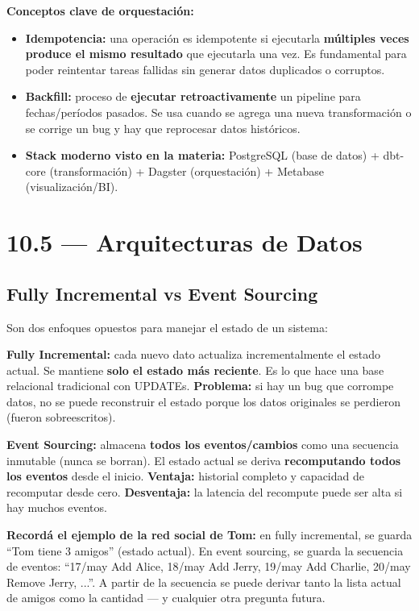 \documentclass[11pt, a4paper]{article}
\begin{document}
\textbf{Conceptos clave de orquestación:}
\begin{itemize}
	\item \textbf{Idempotencia:} una operación es idempotente si ejecutarla \textbf{múltiples veces produce el mismo resultado} que ejecutarla una vez. Es fundamental para poder reintentar tareas fallidas sin generar datos duplicados o corruptos.

	\item \textbf{Backfill:} proceso de \textbf{ejecutar retroactivamente} un pipeline para fechas/períodos pasados. Se usa cuando se agrega una nueva transformación o se corrige un bug y hay que reprocesar datos históricos.

	\item \textbf{Stack moderno visto en la materia:} PostgreSQL (base de datos) + dbt-core (transformación) + Dagster (orquestación) + Metabase (visualización/BI).
\end{itemize}

\section{10.5 — Arquitecturas de Datos}

\subsection{Fully Incremental vs Event Sourcing}

Son dos enfoques opuestos para manejar el estado de un sistema:

\textbf{Fully Incremental:} cada nuevo dato actualiza incrementalmente el estado actual. Se mantiene \textbf{solo el estado más reciente}. Es lo que hace una base relacional tradicional con UPDATEs. \textbf{Problema:} si hay un bug que corrompe datos, no se puede reconstruir el estado porque los datos originales se perdieron (fueron sobreescritos).

\textbf{Event Sourcing:} almacena \textbf{todos los eventos/cambios} como una secuencia inmutable (nunca se borran). El estado actual se deriva \textbf{recomputando todos los eventos} desde el inicio. \textbf{Ventaja:} historial completo y capacidad de recomputar desde cero. \textbf{Desventaja:} la latencia del recompute puede ser alta si hay muchos eventos.

\begin{recallbox}
	\textbf{Recordá el ejemplo de la red social de Tom:} en fully incremental, se guarda ``Tom tiene 3 amigos'' (estado actual). En event sourcing, se guarda la secuencia de eventos: ``17/may Add Alice, 18/may Add Jerry, 19/may Add Charlie, 20/may Remove Jerry, ...''. A partir de la secuencia se puede derivar tanto la lista actual de amigos como la cantidad --- y cualquier otra pregunta futura.
\end{recallbox}
\end{document}
